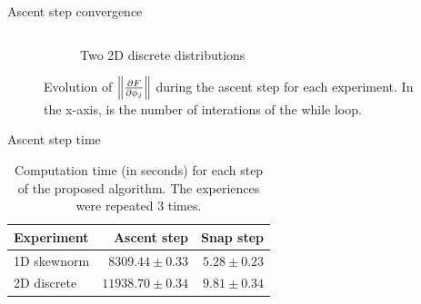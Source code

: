 \begin{frame}{Ascent step convergence}
\begin{figure}
\begin{columns}
\begin{column}{.5\textwidth}
\begin{subfigure}{\textwidth}
                \caption{Two 2D discrete distributions }
            \end{subfigure}
        \end{column}
    \end{columns}
    \caption{\centering Evolution of $\left\lVert \frac{\partial F}{\partial \phi_j} \right\rVert$ during the ascent step for each experiment. In the x-axis, is the number of interations of the while loop.}
    \end{figure}
\end{frame}

\begin{frame}{Ascent step time}
    \begin{table}
        \begin{center}
                \begin{tabular}{lrr}
                        Experiment & Ascent step & Snap step \\
                        \hline\hline
                        1D skewnorm & $8309.44 \pm 0.33$ & $5.28 \pm 0.23$ \\
                        2D discrete & $11938.70 \pm 0.34$ & $9.81 \pm 0.34$ \\
                \end{tabular}
        \end{center}
        \caption{Computation time (in seconds) for each step of the proposed algorithm. The experiences were repeated $3$ times.}
        \label{table:time_algo_table}
    \end{table}
\end{frame}